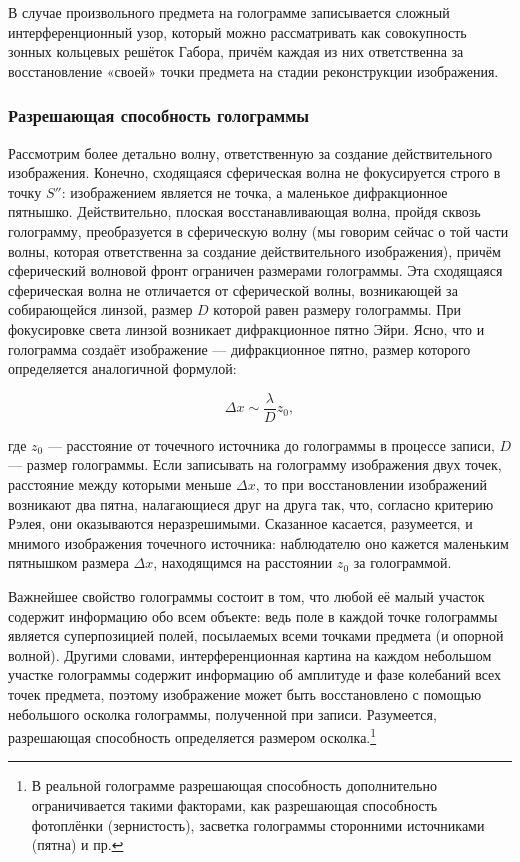 \documentclass[a4paper,12pt]{article}
\begin{document}
В случае произвольного предмета на голограмме записывается сложный интерференционный узор, который можно рассматривать как совокупность зонных кольцевых решёток Габора, причём каждая из них ответственна за восстановление «своей» точки предмета на стадии реконструкции изображения.

\subsubsection{Разрешающая способность голограммы}

Рассмотрим более детально волну, ответственную за создание действительного изображения. Конечно, сходящаяся сферическая волна не фокусируется строго в точку \( S'' \): изображением является не точка, а маленькое дифракционное пятнышко. Действительно, плоская восстанавливающая волна, пройдя сквозь голограмму, преобразуется в сферическую волну (мы говорим сейчас о той части волны, которая ответственна за создание действительного изображения), причём сферический волновой фронт ограничен размерами голограммы. Эта сходящаяся сферическая волна не отличается от сферической волны, возникающей за собирающейся линзой, размер \( D \) которой равен размеру голограммы. При фокусировке света линзой возникает дифракционное пятно Эйри. Ясно, что и голограмма создаёт изображение — дифракционное пятно, размер которого определяется аналогичной формулой:

\[ \Delta x \sim \frac{\lambda}{D} z_0, \]

где \( z_0 \) — расстояние от точечного источника до голограммы в процессе записи, \( D \) — размер голограммы. Если записывать на голограмму изображения двух точек, расстояние между которыми меньше \(\Delta x\), то при восстановлении изображений возникают два пятна, налагающиеся друг на друга так, что, согласно критерию Рэлея, они оказываются неразрешимыми. Сказанное касается, разумеется, и мнимого изображения точечного источника: наблюдателю оно кажется маленьким пятнышком размера \(\Delta x\), находящимся на расстоянии \( z_0 \) за голограммой.

Важнейшее свойство голограммы состоит в том, что любой её малый участок содержит информацию обо всем объекте: ведь поле в каждой точке голограммы является суперпозицией полей, посылаемых всеми точками предмета (и опорной волной). Другими словами, интерференционная картина на каждом небольшом участке голограммы содержит информацию об амплитуде и фазе колебаний всех точек предмета, поэтому изображение может быть восстановлено с помощью небольшого осколка голограммы, полученной при записи. Разумеется, разрешающая способность определяется размером осколка.\footnote{В реальной голограмме разрешающая способность дополнительно ограничивается такими факторами, как разрешающая способность фотоплёнки (зернистость), засветка голограммы сторонними источниками (пятна) и пр.}
\end{document}

